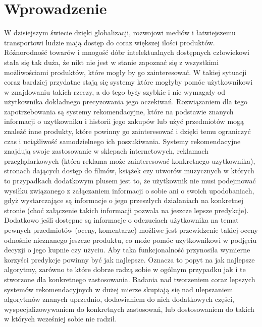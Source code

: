 \documentclass{pracamgr}
\begin{document}
 \chapter*{Wprowadzenie}
  W dzisiejszym świecie dzięki globalizacji, rozwojowi mediów i łatwiejszemu transportowi ludzie mają dostęp do coraz większej ilości produktów. 
  Różnorodność towarów i mnogość dóbr intelektualnych dostępnych człowiekowi stała się tak duża, że nikt nie jest w stanie zapoznać się z wszystkimi
  możliwościami produktów, które mogły by go zainteresować. W takiej sytuacji coraz bardziej przydatne stają się systemy które mogłyby pomóc użytkownikowi
  w znajdowaniu takich rzeczy, a do tego były szybkie i nie wymagały od użytkownika dokładnego precyzowania jego oczekiwań.
  Rozwiązaniem dla tego zapotrzebowania są systemy rekomendacyjne, które na podstawie znanych informacji o uzytkowniku
  i historii jego zakupów lub użyć przedmiotów mogą znaleźć inne produkty, które powinny go zainteresować i dzięki temu ograniczyć czas i uciążliwość
  samodzielnego ich poszukiwania.\newline
  Systemy rekomendacyjne znajdują swoje zastosowanie w sklepach internetowych, reklamach przeglądarkowych
  (która reklama może zainteresować konkretnego uzytkownika), stronach dających dostęp do filmów, książek czy utworów muzycznych
  w których to przypadkach dodatkowym plusem jest to, że użytkownik nie musi podejmować wysiłku związanego z załączaniem informacji o sobie ani
  o swoich upodobaniach, gdyż wystarczające są informacje o jego przeszłych działaniach na konkretnej stronie
  (choć załączenie takich informacji pozwala na jeszcze lepsze predykcje). Dodatkowo jeśli dostępne są informacje o odczuciach użytkownika
  na temat pewnych przedmiotów (oceny, komentarze) możliwe jest przewidzenie takiej oceny odnośnie nieznanego jeszcze produktu, co może pomóc uzytkownikowi
  w podjęciu decyzji o jego kupnie czy użyciu.\newline
  Aby taka funkcjonalność przynosiła wymierne korzyści predykcje powinny być jak najlepsze. Oznacza to popyt na jak najlepsze algorytmy,
  zarówno te które dobrze radzą sobie w ogólnym przypadku jak i te stworzone dla konkretnego zastosowania.\newline
  Badania nad tworzeniem coraz lepszych systemów rekomendacyjnych w dużej mierze skupiają się nad ulepszaniem algorytmów znanych
  uprzednio, dodawianiem do nich dodatkowych części, wyspecjalizowywaniem do konkretnych zastosowań,
  lub dostosowaniem do takich w których wcześniej sobie nie radził.\newline
  
\end{document}
